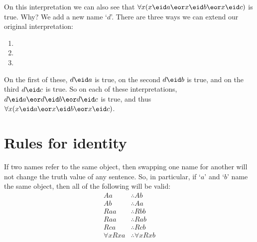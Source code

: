 On this interpretation we can also see that $\forall x(x\eid a\eor x\eid b\eor x\eid c)$ is true. Why? We add a new name `$d$'. There are three ways we can extend our original interpretation:\begin{enumerate}
\item
{}
\item
{}
\item
{}
\end{enumerate}
On the first of these, $d\eid a$ is true, on the second $d\eid b$ is true, and on the third $d\eid c$ is true. So on each of these interpretations, $d\eid a\eor d\eid b\eor d\eid c$ is true, and thus $\forall x(x\eid a\eor x\eid b\eor x\eid c)$.



%



\chapter{Rules for identity}
If two names refer to the same object, then swapping one name for another will not change the truth value of any sentence. So, in particular, if `$a$' and `$b$' name the same object, then all of the following will be valid:\label{model.nonidentity}
	\begin{align*}
	 	Aa &\therefore Ab \\
	 	Ab &\therefore Aa \\
	 	Raa &\therefore Rbb\\
		Raa & \therefore Rab\\
		Rca &\therefore Rcb\\
		\forall x Rxa &\therefore \forall x Rxb
	\end{align*}

